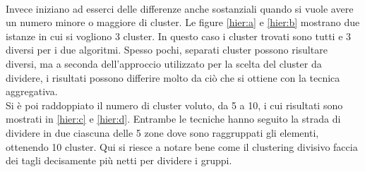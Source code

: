 \documentclass{llncs}
\newcommand{\acapo}{\vspace{0.5\baselineskip}\\}
\begin{document}
	\\
	Invece iniziano ad esserci delle differenze anche sostanziali quando si vuole avere un numero minore o maggiore di cluster.
	Le figure \ref{hier:a} e \ref{hier:b} mostrano due istanze in cui si vogliono 3 cluster. In questo caso i cluster trovati sono tutti e 3 diversi per i due algoritmi.
	Spesso pochi, separati cluster possono risultare diversi, ma a seconda dell'approccio utilizzato per la scelta del cluster da dividere,
	i risultati possono differire molto da ciò che si ottiene con la tecnica aggregativa.
	\acapo
	Si è poi raddoppiato il numero di cluster voluto, da 5 a 10, i cui risultati sono mostrati in \ref{hier:c} e \ref{hier:d}.
	Entrambe le tecniche hanno seguito la strada di dividere in due ciascuna delle 5 zone dove sono raggruppati gli elementi, ottenendo 10 cluster.
	Qui si riesce a notare bene come il clustering divisivo faccia dei tagli decisamente più netti per dividere i gruppi.
\end{document}
